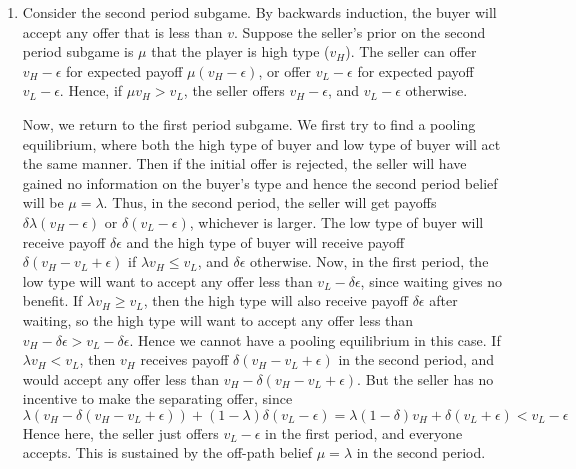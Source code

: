\documentclass[10pt,letter]{article}
\begin{document}
\begin{enumerate}[label=(\alph*)]
\item Consider the second period subgame. By backwards induction, the buyer will accept any offer that is less than $v$. Suppose the seller's prior on the second period subgame is $\mu$ that the player is high type ($v_H$). The seller can offer $v_H - \epsilon$ for expected payoff $\mu (v_H - \epsilon)$, or offer $v_L - \epsilon$ for expected payoff $v_L - \epsilon$. Hence, if $\mu v_H > v_L$, the seller offers $v_H - \epsilon$, and $v_L - \epsilon$ otherwise.

Now, we return to the first period subgame. We first try to find a pooling equilibrium, where both the high type of buyer and low type of buyer will act the same manner. Then if the initial offer is rejected, the seller will have gained no information on the buyer's type and hence the second period belief will be $\mu = \lambda$. Thus, in the second period, the seller will get payoffs $\delta \lambda (v_H - \epsilon)$ or $\delta (v_L - \epsilon)$, whichever is larger. The low type of buyer will receive payoff $\delta\epsilon$ and the high type of buyer will receive payoff $\delta (v_H - v_L + \epsilon)$ if $\lambda v_H \le v_L$, and $\delta \epsilon$ otherwise. Now, in the first period, the low type will want to accept any offer less than $v_L - \delta \epsilon$, since waiting gives no benefit.
If $\lambda v_H \ge v_L$, then the high type will also receive payoff $\delta \epsilon$ after waiting, so the high type will want to accept any offer less than $v_H - \delta \epsilon > v_L - \delta \epsilon$. Hence we cannot have a pooling equilibrium in this case.
If $\lambda v_H < v_L$, then $v_H$ receives payoff $\delta (v_H - v_L + \epsilon)$ in the second period, and would accept any offer less than $v_H - \delta (v_H - v_L + \epsilon)$. But the seller has no incentive to make the separating offer, since
\[ \lambda (v_H - \delta (v_H - v_L + \epsilon)) + (1-\lambda)\delta (v_L - \epsilon) = \lambda (1-\delta) v_H + \delta (v_L + \epsilon) < v_L - \epsilon \]
Hence here, the seller just offers $v_L-\epsilon$ in the first period, and everyone accepts. This is sustained by the off-path belief $\mu = \lambda$ in the second period.


\end{enumerate}
\end{document}
